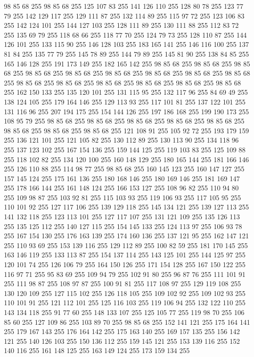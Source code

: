 98 85 68 255 98 85 68 255 125 107 83 255 141 126 110 255 128 80 78 255 123 77 79 255 142 129 117 255 129 111 87 255 132 114 89 255 115 97 72 255 123 106 83 255 142 124 101 255 144 127 103 255 128 111 89 255 130 111 88 255 112 83 72 255 135 69 79 255 118 68 66 255 118 77 70 255 124 79 73 255 128 110 87 255 144 126 101 255 133 115 90 255 146 128 103 255 183 165 141 255 146 116 100 255 137 81 84 255 135 77 79 255 145 78 89 255 144 79 89 255 145 81 90 255 138 84 85 255 165 146 128 255 191 173 149 255 182 165 142 255 98 85 68 255 98 85 68 255 98 85 68 255 98 85 68 255 98 85 68 255 98 85 68 255 98 85 68 255 98 85 68 255 98 85 68 255 98 85 68 255 98 85 68 255 98 85 68 255 98 85 68 255 98 85 68 255 98 85 68 255 162 150 133 255 135 120 101 255 131 115 95 255 132 117 96 255 84 69 49 255 138 124 105 255 179 164 146 255 129 113 93 255 117 101 81 255 137 122 101 255 131 116 96 255 207 194 175 255 154 144 126 255 197 186 168 255
199 190 173 255 108 95 79 255 98 85 68 255 98 85 68 255 98 85 68 255 98 85 68 255 98 85 68 255 98 85 68 255 98 85 68 255 98 85 68 255 121 108 91 255 105 92 72 255 193 179 159 255 136 121 101 255 121 105 82 255 130 112 89 255 130 113 90 255 134 118 96 255 137 123 102 255 167 154 136 255 159 144 125 255 119 103 83 255 125 109 88 255 118 102 82 255 134 120 100 255 160 148 129 255 180 165 144 255 181 166 146 255 126 110 88 255 114 98 77 255 98 85 68 255 160 145 123 255 160 147 127 255 157 145 124 255 175 161 136 255 180 168 146 255 180 169 146 255 181 169 147 255 178 166 144 255 161 148 124 255 166 153 127 255 108 96 82 255 110 94 80 255 109 98 87 255 103 92 81 255 115 103 93 255 119 106 93 255 117 105 95 255 110 101 92 255 127 117 106 255 139 129 118 255 145 134 121 255 139 127 113 255 141 132 118 255 123 113 101 255 127 117 107 255 131 121 109 255 135 126 113 255 135 125 112 255 140 127 115 255 154 145 133 255 124 113 97 255 106 93 78 255 167 154 130 255
176 163 139 255 174 160 136 255 137 121 95 255 162 147 121 255 110 93 69 255 153 139 116 255 129 112 89 255 100 82 59 255 181 170 145 255 163 146 119 255 133 113 87 255 154 137 114 255 143 125 101 255 144 125 97 255 120 101 74 255 126 106 79 255 164 150 126 255 171 154 128 255 167 150 122 255 116 97 71 255 95 83 69 255 109 94 79 255 102 91 80 255 96 87 76 255 111 101 91 255 111 98 87 255 108 97 87 255 100 91 81 255 117 108 97 255 129 119 108 255 130 120 109 255 127 115 102 255 126 118 105 255 109 102 92 255 109 102 93 255 110 101 91 255 121 112 101 255 125 116 103 255 119 106 94 255 132 122 110 255 143 134 118 255 91 77 60 255 148 133 107 255 125 105 77 255 119 98 70 255 106 85 60 255 127 109 86 255 103 89 70 255 98 85 68 255 152 141 121 255 175 164 141 255 179 167 143 255 176 164 142 255 175 163 140 255 169 157 135 255 156 142 121 255 140 126 103 255 150 136 112 255 159 145 121 255 153 139 116 255 152 140 116 255 161 148 125 255 163 149 124 255 173 159 134 255
